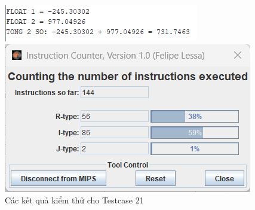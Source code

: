 \begin{figure}[!h]
    \centering
    \begin{minipage}[b]{0.48\textwidth}
        \centering
        \includegraphics[width=\textwidth]{image/TESTCASE/Testcase 21.png}
    \end{minipage}
    \hfill
    \begin{minipage}[b]{0.48\textwidth}
        \centering
        \includegraphics[width=\textwidth]{image/TESTCASE/Instruction Counter 21.png}
    \end{minipage}
    \vspace{0.5cm}
    \caption{Các kết quả kiểm thử cho Testcase 21}
\end{figure}

\vspace{0.5cm}

